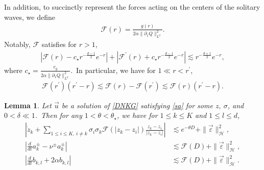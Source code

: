 \documentclass[reqno]{amsart}
\theoremstyle{plain}
\newtheorem{lemma}[theorem]{Lemma}
\theoremstyle{definition}
\numberwithin{equation}{section}
\newcommand{\1}{\mathbbm{1}}
\begin{document}
In addition, to succinctly represent the forces acting on the centers of the solitary waves, we define
\begin{align}\label{Fdef}
\mathcal{F}(r)=\frac{g(r)}{2\alpha\|{\partial}_1Q\|_{L^2}^2}.
\end{align}
Notably, $\mathcal{F}$ satisfies for $r>1$,
\begin{align}\label{Fesa}
|\mathcal{F}(r)-c_{\star}r^{-\frac{d-1}{2}}e^{-r}|+|\mathcal{F}^{\prime}(r)+c_{\star}r^{-\frac{d-1}{2}}e^{-r}|\lesssim r^{-\frac{d+1}{2}}e^{-r},
\end{align}
where $c_{\star}=\frac{c_g}{2\alpha \|{\partial}_1Q\|_{L^2}^2}$.\ In particular, we have for $1\ll r<r^{\prime}$,
\begin{align}\label{Fesb}
\mathcal{F}(r^{\prime})(r^{\prime}-r)\lesssim\mathcal{F}(r)-\mathcal{F}(r^{\prime})\lesssim \mathcal{F}(r)(r^{\prime}-r).
\end{align}
\begin{lemma}\label{expansionlem}
Let $\vec{u}$ be a solution of \eqref{DNKG} satisfying \eqref{sa} for some $z,\ \sigma$, and $0<\delta\ll 1$.\ Then for any $1<\theta<\theta_{\star}$, we have for $1\leq k\leq K$ and $1\leq l\leq d$,
\begin{align}
\left|\dot{z}_k+\sum_{1\leq i\leq K,\ i\neq k}\sigma_i\sigma_k\mathcal{F}(|z_k-z_i|) \frac{z_k-z_i}{|z_k-z_i|}\right|&\lesssim e^{-\theta D}+\|\vec{\varepsilon}\|_{\mathcal{H}}^2,\label{zes}
\\
\left| \frac{d}{dt}a_k^{\pm}-\nu^{\pm}a_k^{\pm}\right|&\lesssim \mathcal{F}(D)+\|\vec{\varepsilon}\|_{\mathcal{H}}^2,\label{apmes}
\\
\left|\frac{d}{dt}b_{k,l}+2\alpha b_{k,l}\right|&\lesssim \mathcal{F}(D)+\|\vec{\varepsilon}\|_{\mathcal{H}}^2.\label{bes}
\end{align}
\end{lemma}
\end{document}
